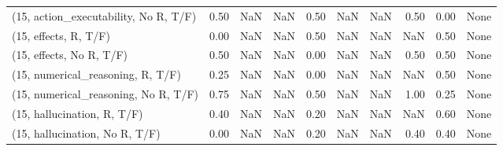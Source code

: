 \begin{table*}[h!]
\begin{adjustbox}{width=2\columnwidth,center}
\begin{tabular}{lrrr|rrr|rrr}
(15, action\_executability, No R, T/F) &                      0.50 &                   NaN &                       NaN &                          0.50 &                       NaN &                           NaN &                                   0.50 &                               0.00 &                                  None \\
(15, effects, R, T/F)                 &                      0.00 &                   NaN &                       NaN &                          0.50 &                       NaN &                           NaN &                                    NaN &                               0.50 &                                  None \\
(15, effects, No R, T/F)              &                      0.50 &                   NaN &                       NaN &                          0.00 &                       NaN &                           NaN &                                   0.50 &                               0.50 &                                  None \\
(15, numerical\_reasoning, R, T/F)     &                      0.25 &                   NaN &                       NaN &                          0.00 &                       NaN &                           NaN &                                    NaN &                               0.50 &                                  None \\
(15, numerical\_reasoning, No R, T/F)  &                      0.75 &                   NaN &                       NaN &                          0.50 &                       NaN &                           NaN &                                   1.00 &                               0.25 &                                  None \\
(15, hallucination, R, T/F)           &                      0.40 &                   NaN &                       NaN &                          0.20 &                       NaN &                           NaN &                                    NaN &                               0.60 &                                  None \\
(15, hallucination, No R, T/F)        &                      0.00 &                   NaN &                       NaN &                          0.20 &                       NaN &                           NaN &                                   0.40 &                               0.40 &                                  None \\

\end{tabular}
\end{adjustbox}
\end{table*}
